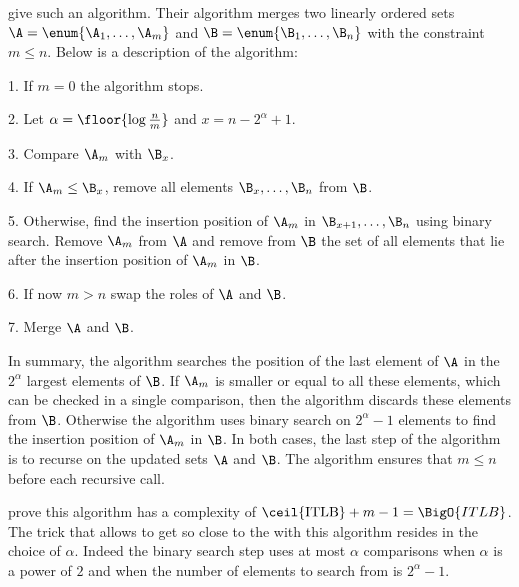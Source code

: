 \citet*{DBLP:journals/siamcomp/HwangL72} give such an algorithm. Their
algorithm merges two linearly ordered sets \(\A = \enum{\A_1,\dots,\A_m}\) and
\(\B = \enum{\B_1,\dots,\B_n}\) with the constraint \(m \le n\). Below is a
description of the algorithm:

\begin{algorithm}
\item[1.] If \(m = 0\) the algorithm stops.
\item[2.] Let \(\alpha = \floor{\log \frac{n}{m}}\) and \(x = n - 2^{\alpha} + 1\).
\item[3.] Compare \(\A_m\) with \(\B_x\).
\item[4.] If \(\A_m \le \B_x\), remove all elements \(\B_x,\dots,\B_n\) from
\(\B\).
\item[5.] Otherwise, find the insertion position of \(\A_m\) in
\(\B_{x+1},\dots,\B_{n}\) using binary search. Remove \(\A_m\) from \(\A\) and
remove from \(\B\) the set of all elements that lie after the insertion
position of \(\A_m\) in \(\B\).
\item[6.] If now \(m > n\) swap the roles of \(\A\) and \(\B\).
\item[7.] Merge \(\A\) and \(\B\).
\end{algorithm}

In summary, the algorithm searches the position of the last element of \(\A\)
in the \(2^{\alpha}\) largest elements of \(\B\). If \(\A_m\) is smaller or
equal to all these elements, which can be checked in a single comparison, then
the algorithm discards these elements from \(\B\). Otherwise the algorithm uses
binary search on \(2^{\alpha}-1\) elements to find the insertion position of
\(\A_m\) in \(\B\). In both cases, the last step of the algorithm is to recurse
on the updated sets \(\A\) and \(\B\). The algorithm ensures that \(m \le n\)
before each recursive call.

\citet*{DBLP:journals/siamcomp/HwangL72} prove this algorithm has a complexity
of \(\ceil{\text{ITLB}} + m - 1 = \BigO{ITLB}\). The trick that allows to
get so close to the  with this algorithm resides in the choice of
\(\alpha\). Indeed the binary search step uses at most \(\alpha\) comparisons
when \(\alpha\) is a power of \(2\) and when the number of elements to search
from is \(2^{\alpha}-1\).

